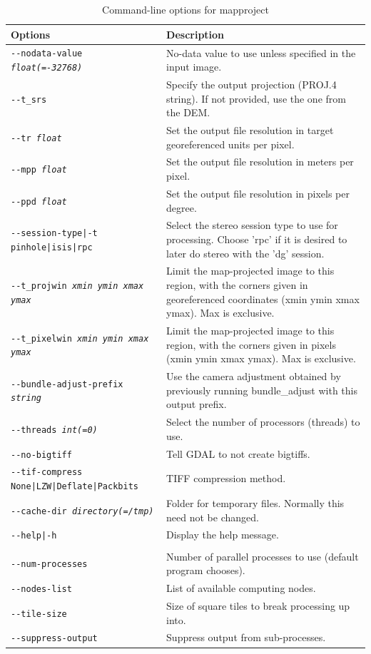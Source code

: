 \begin{longtable}{|l|p{10cm}|}
\caption{Command-line options for mapproject}
\label{tbl:mapproject}
\endfirsthead
\endhead
\endfoot
\endlastfoot
\hline
Options & Description \\ \hline \hline
\texttt{-\/-nodata-value \textit{float(=-32768)}} & No-data value to use unless specified in the input image. \\ \hline
\texttt{-\/-t\_srs} & Specify the output projection (PROJ.4 string). If not provided, use the one from the DEM. \\ \hline
\texttt{-\/-tr \textit{float}} & Set the output file resolution in target
  georeferenced units per pixel. \\ \hline
\texttt{-\/-mpp \textit{float}} & Set the output file resolution in meters per
pixel. \\ \hline
\texttt{-\/-ppd \textit{float}} & Set the output file resolution in pixels per
degree. \\ \hline
\texttt{-\/-session-type|-t pinhole|isis|rpc} & Select the stereo
session type to use for processing. Choose 'rpc' if it is desired to later do stereo with the 'dg' session. \\ \hline
\texttt{-\/-t\_projwin \textit{xmin ymin xmax ymax}} & Limit the map-projected image to this region, with the corners given in georeferenced coordinates (xmin ymin xmax ymax). Max is exclusive. \\ \hline
\texttt{-\/-t\_pixelwin \textit{xmin ymin xmax ymax}} & Limit the map-projected image to this region, with the corners given in pixels (xmin ymin xmax ymax). Max is exclusive. \\ \hline
\texttt{-\/-bundle-adjust-prefix \textit{string}} & Use the camera
adjustment obtained by previously running bundle\_adjust with this
output prefix. \\ \hline
\texttt{-\/-threads \textit{int(=0)}} & Select the number of processors (threads) to use.\\ \hline
\texttt{-\/-no-bigtiff} & Tell GDAL to not create bigtiffs.\\ \hline
\texttt{-\/-tif-compress None|LZW|Deflate|Packbits} & TIFF compression method.\\ \hline
\texttt{-\/-cache-dir \textit{directory(=/tmp)}} & Folder for temporary files. Normally this need not be changed.\\ \hline
\texttt{-\/-help|-h} & Display the help message. \\ \hline
\\ \hline
\texttt{-\/-num-processes} & Number of parallel processes to use (default program chooses).\\ \hline
\texttt{-\/-nodes-list} & List of available computing nodes.\\ \hline
\texttt{-\/-tile-size} & Size of square tiles to break processing up into.\\ \hline
\texttt{-\/-suppress-output} & Suppress output from sub-processes.\\ \hline
\end{longtable}

